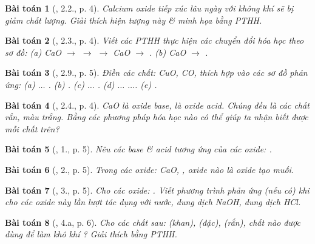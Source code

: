 \documentclass{article}
\newtheorem{baitoan}{Bài toán}
\begin{document}
\begin{baitoan}[\cite{SBT_Hoa_Hoc_9}, 2.2., p. 4]
	Calcium oxide tiếp xúc lâu ngày với không khí sẽ bị giảm chất lượng. Giải thích hiện tượng này \& minh họa bằng PTHH.
\end{baitoan}

\begin{baitoan}[\cite{SBT_Hoa_Hoc_9}, 2.3., p. 4]
	Viết các PTHH thực hiện các chuyển đổi hóa học theo sơ đồ: (a) \emph{CaO $\to$  $\to$  $\to$ CaO $\to$ }. (b) \emph{CaO $\to$ }.
\end{baitoan}

\begin{baitoan}[\cite{SBT_Hoa_Hoc_9}, 2.9., p. 5]
	Điền các chất: \emph{CuO, CO, } thích hợp vào các sơ đồ phản ứng: (a) $\ldots$ \emph{}. (b) \emph{}. (c) $\ldots$ \emph{}. (d) $\ldots$ \emph{ $\ldots$}. (e) \emph{}.
\end{baitoan}

\begin{baitoan}[\cite{SBT_Hoa_Hoc_9}, 2.4., p. 4]
	\emph{CaO} là oxide base, \emph{} là oxide acid. Chúng đều là các chất rắn, màu trắng. Bằng các phương pháp hóa học nào có thể giúp ta nhận biết được mỗi chất trên?
\end{baitoan}

\begin{baitoan}[\cite{An_350_BT_Hoa_Hoc_9}, 1., p. 5]
	Nêu các base \& acid tương ứng của các oxide: \emph{}.
\end{baitoan}

\begin{baitoan}[\cite{An_350_BT_Hoa_Hoc_9}, 2., p. 5]
	Trong các oxide: \emph{CaO, }, oxide nào là oxide tạo muối.
\end{baitoan}

\begin{baitoan}[\cite{An_350_BT_Hoa_Hoc_9}, 3., p. 5]
	Cho các oxide: \emph{}. Viết phương trình phản ứng (nếu có) khi cho các oxide này lần lượt tác dụng với nước, dung dịch \emph{NaOH}, dung dịch \emph{HCl}.
\end{baitoan}

\begin{baitoan}[\cite{An_350_BT_Hoa_Hoc_9}, 4.a, p. 6]
	Cho các chất sau: \emph{ (khan),  (đặc),  (rắn)}, chất nào được dùng để làm khô khí \emph{}? Giải thích bằng PTHH.
\end{baitoan}
\end{document}
